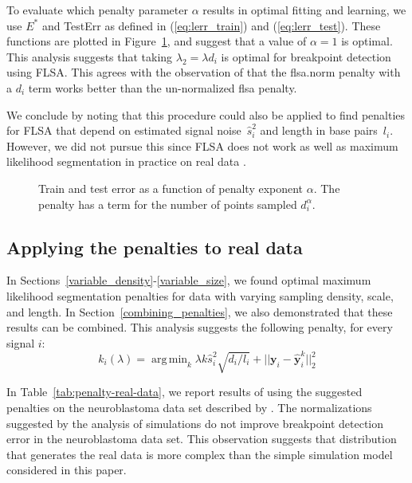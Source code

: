 \documentclass{jsfds} %
\newcommand{\fig}[3][H]{
  \begin{figure}[#1]
    \hskip -1cm
    
    \caption{#3}
    \label{fig:#2}
  \end{figure}
}
\DeclareMathOperator*{\argmin}{arg\,min}
\begin{document}
To evaluate which penalty parameter $\alpha$ results in optimal
fitting and learning, we use $E^*$ and TestErr as defined in
(\ref{eq:lerr_train}) and (\ref{eq:lerr_test}). These functions are
plotted in Figure~\ref{fig:variable-density-error-alpha-flsa}, and
suggest that a value of $\alpha=1$ is optimal.  This analysis suggests
that taking $\lambda_2=\lambda d_i$ is optimal for breakpoint
detection using FLSA. This agrees with the observation of
\citet{HOCKING-breakpoints} that the flsa.norm penalty with a $d_i$
term works better than the un-normalized flsa penalty.

We conclude by noting that this procedure could also be applied to
find penalties for FLSA that depend on estimated signal noise~$\hat
s_i^2$ and length in base pairs~$l_i$. However, we did not pursue this
since FLSA does not work as well as maximum likelihood segmentation in
practice on real data \citep{HOCKING-breakpoints}.

\fig{variable-density-error-alpha-flsa}{Train and test error as a
  function of penalty exponent $\alpha$. The penalty has a term for
  the number of points sampled $d_i^\alpha$.}


\newpage

\subsection{Applying the penalties to real data}

In Sections~\ref{variable_density}-\ref{variable_size}, we found
optimal maximum likelihood segmentation penalties for data with
varying sampling density, scale, and length. In
Section~\ref{combining_penalties}, we also demonstrated that these
results can be combined. This analysis suggests the following penalty,
for every signal $i$:
\begin{equation}
  \label{eq:composite_penalty}
  k_i(\lambda) = 
  \argmin_k
  \lambda k \hat s_i^2 \sqrt{d_i/l_i}  +
  ||\mathbf y_i - \mathbf{\hat y}_i^k||^2_2
\end{equation}

In Table~\ref{tab:penalty-real-data}, we report results of using the
suggested penalties on the neuroblastoma data set described by
\citet{HOCKING-breakpoints}. The normalizations suggested by the
analysis of simulations do not improve breakpoint detection error in
the neuroblastoma data set. This observation suggests that
distribution that generates the real data is more complex than the
simple simulation model considered in this paper.
\end{document}
